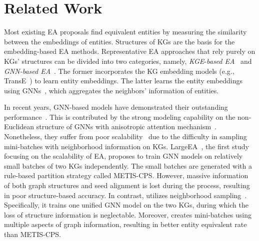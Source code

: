 

\vspace*{-2mm}
\section{Related Work}
\label{sec:related_work}

Most existing EA proposals find equivalent entities by measuring the similarity between the embeddings of entities. Structures of KGs are the basis for the embedding-based EA methods.
Representative EA approaches that rely purely on KGs' structures can be divided into two categories, namely, \emph{KGE}-\emph{based EA}~\cite{MTransE17, IPTransE17, BootEA18, TransEdge19} and \emph{GNN-based EA}~\cite{GCN-Align18, KECG19, MRAEA20, AliNet20, HyperKA20, MuGNN19}.
The former incorporates the KG embedding models (e.g., TransE~\cite{TransE13}) to learn entity embeddings. The latter
learns the entity embeddings using GNNs~\cite{GCN17}, which aggregates the neighbors' information of entities.

In recent years, GNN-based models have demonstrated their outstanding performance~\cite{DualAMN21}. This is contributed by the strong modeling capability on the non-Euclidean structure of GNNs with anisotropic attention mechanism~\cite{GAT18}. Nonetheless, they suffer from poor scalability~\cite{LargeEA22} due to the difficulty in sampling mini-batches with neighborhood information on KGs. LargeEA~\cite{LargeEA22}, the first study focusing on the scalability of EA, proposes to train GNN models on relatively small batches of two KGs independently.
The small batches are generated with a rule-based partition strategy called METIS-CPS.
However, massive information of both graph structures and seed alignment is lost during the process, resulting in poor structure-based accuracy. In contrast, \ClusterEA{} utilizes neighborhood sampling~\cite{GraphSAGE17}. Specifically, it trains one unified GNN model on the two KGs, during which the loss of structure information is neglectable.
Moreover, \ClusterEA{} creates mini-batches using multiple aspects of graph information, resulting in better entity equivalent rate than METIS-CPS.

